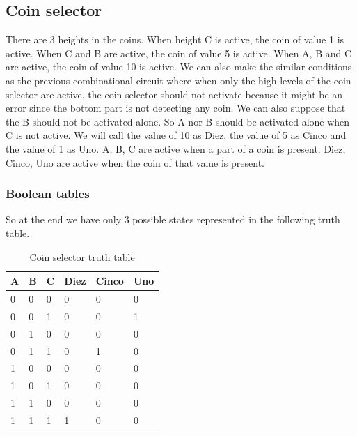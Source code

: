 \documentclass{article}
\begin{document}
\begin{multicols}{2}
	\subsection*{Coin selector}\label{Coin selector Analysis}

	There are 3 heights in the coins. When height C is active, the coin of value 1 is active. When C and B are active, the coin of value 5 is active. When A, B and C are active, the coin of value 10 is active. We can also make the similar conditions as the previous combinational circuit where when only the high levels of the coin selector are active, the coin selector should not activate because it might be an error since the bottom part is not detecting any coin. We can also suppose that the B should not be activated alone. So A nor B should be activated alone when C is not active. We will call the value of 10 as Diez, the value of 5 as Cinco and the value of 1 as Uno. A, B, C are active when a part of a coin is present. Diez, Cinco, Uno are active when the coin of that value is present.

	\subsubsection*{Boolean tables}\label{Coin selector Boolean tables}

	So at the end we have only 3 possible states represented in the following truth table.

	\begin{table}[H]
		\centering
		\caption{Coin selector truth table}
		\vspace*{1em}
		\begin{tabular}{|l|l|l|l|l|l|}
			\hline
			A & B & C & Diez & Cinco & Uno \\ \hline
			0 & 0 & 0 & 0    & 0     & 0   \\ \hline
			0 & 0 & 1 & 0    & 0     & 1   \\ \hline
			0 & 1 & 0 & 0    & 0     & 0   \\ \hline
			0 & 1 & 1 & 0    & 1     & 0   \\ \hline
			1 & 0 & 0 & 0    & 0     & 0   \\ \hline
			1 & 0 & 1 & 0    & 0     & 0   \\ \hline
			1 & 1 & 0 & 0    & 0     & 0   \\ \hline
			1 & 1 & 1 & 1    & 0     & 0   \\ \hline
		\end{tabular}
		\label{Coin selector truth table}
	\end{table}


\end{multicols}
\end{document}
